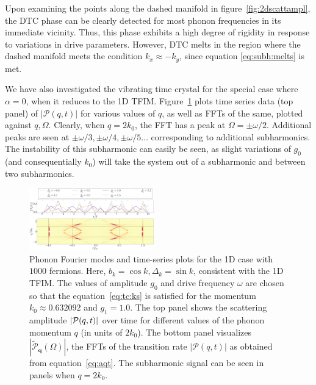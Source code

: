 \documentclass[preprint,5p,times,twocolumn]{elsarticle}
\newcommand{\bmq}{\bm{q}}
\begin{document}
Upon examining the points along the dashed manifold in figure~\ref{fig:2dscattampl}, the DTC phase can be clearly detected for most phonon frequencies in its immediate vicinity. Thus, this phase exhibits a high degree of rigidity in response to variations in drive parameters. However, DTC melts in the region where the dashed manifold meets the condition $k_x\approx-k_y$, since equation \ref{eq:subh:melts} is met.

We have also investigated the vibrating time crystal for the special case where $\alpha=0$, when it reduces to the 1D TFIM. Figure~\ref{fig:1dscattampl} plots time series data (top panel) of $|\mathcal{P}(q, t)|$ for various values of $q$, as well as FFTs of the same, plotted against $q, \Omega$. Clearly, when $q=2k_0$, the FFT has a peak at $\Omega=\pm\omega/2$. Additional peaks are seen at $\pm\omega/3, \pm\omega/4, \pm\omega/5 \dots$ corresponding to additional subharmonics. The instability of this subharmonic can easily be seen, as slight variations of $g_0$ (and consequentially $k_0$) will take the system out of a subharmonic and between two subharmonics.
\begin{figure}[t!]
    \includegraphics[width=0.48\textwidth, keepaspectratio]{fig5_1d_ampl.png}
    \caption{Phonon Fourier modes and time-series plots for the 1D case with $1000$ fermions. Here, $b_k = \cos{k}, \Delta_k=\sin{k}$, consistent with the 1D TFIM. The values of amplitude $g_0$ and drive frequency $\omega$ are chosen so that the equation~\ref{eq:tc:ks} is satisfied for the momentum ${k}_0\approx 0.632092$ and $ g_1=1.0$. The top panel shows the scattering amplitude $\abs{\mathcal{P}(q, t)}$ over time for different values of the phonon momentum $q$ (in units of $2k_0$). The bottom panel visualizes $|\widetilde{\mathcal{P}}_{\bmq}(\Omega)|$, the FFTs of the transition rate $|\mathcal{P}(q, t)|$ as obtained from equation~\ref{eq:aqt}. The subharmonic signal can be seen in panels when $q=2k_0$.}
\label{fig:1dscattampl}
\end{figure}
\end{document}
